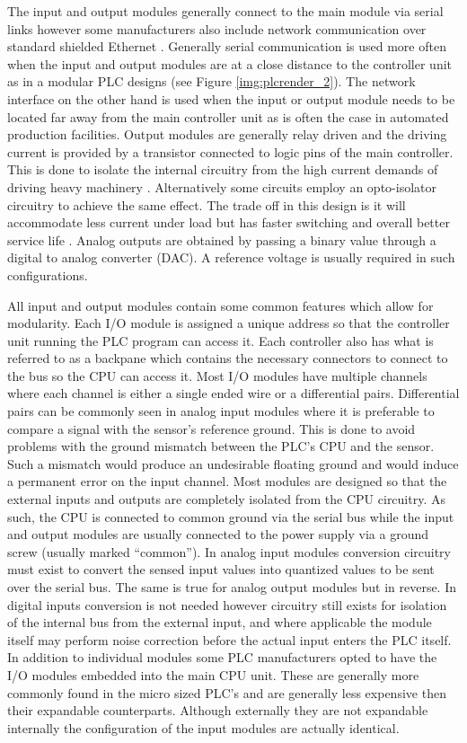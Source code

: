 The input and output modules generally connect to the main module via serial links however some manufacturers also include network communication over standard shielded Ethernet \cite{rockwell_io,rockwell_tech_pub}. Generally serial communication is used more often when the input and output modules are at a close distance to the controller unit as in a modular PLC designs  (see Figure \ref{img:plcrender_2}). The network interface on the other hand is used when the input or output module needs to be located far away from the main controller unit \cite{rockwell_tech_pub} as is often the case in automated production facilities. Output modules are generally relay driven and the driving current is provided by a transistor connected to logic pins of the main controller. This is done to isolate the internal circuitry from the high current demands of driving heavy machinery \cite{plcapp}. Alternatively some circuits employ an opto-isolator circuitry to achieve the same effect. The trade off in this design is it will accommodate less current under load but has faster switching and overall better service life \cite{plcapp}. Analog outputs are obtained by passing a binary value through a digital to analog converter (DAC). A reference voltage is usually required in such configurations.

All input and output modules contain some common  features which allow for modularity. Each I/O module is assigned a unique address so that the controller unit running the PLC program can access it. Each controller also has what is referred to as a backpane which contains the necessary connectors to connect to the bus so the CPU can access it. Most I/O modules have multiple channels where each channel is either a single ended wire or a differential pairs. Differential pairs can be commonly seen in analog input modules where it is preferable to compare a signal with the sensor's reference ground. This is done to avoid problems with the ground mismatch between the PLC's CPU and the sensor. Such a mismatch would produce an undesirable floating ground and would induce a permanent error on the input channel. Most modules are designed so that the external inputs and outputs are completely isolated from the CPU circuitry. As such, the CPU is connected to common ground via the serial bus while the input and output modules are usually connected to the power supply via a ground screw (usually marked ``common''). In analog input modules conversion circuitry must exist to convert the sensed input values into quantized values to be sent over the serial bus. The same is true for analog output modules but in reverse. In digital inputs conversion is not needed however circuitry still exists for isolation of the internal bus from the external input, and where applicable the module itself may perform noise correction before the actual input enters the PLC itself. In addition to individual modules some PLC manufacturers opted to have the I/O modules embedded into the main CPU unit. These are generally more commonly found in the micro sized PLC's and are generally less expensive then their expandable counterparts. Although externally they are not expandable internally the configuration of the input modules are actually identical.

